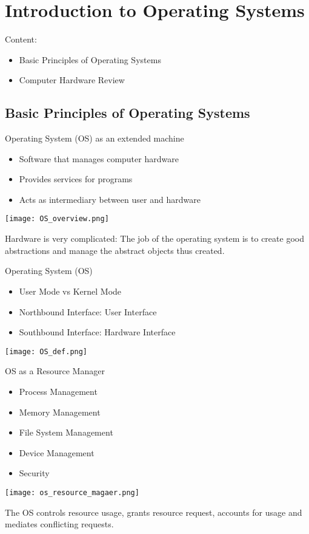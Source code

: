 \section{Introduction to Operating Systems}

\begin{remark}
    Content:
    \begin{itemize}
        \item Basic Principles of Operating Systems
        \item Computer Hardware Review
    \end{itemize}
\end{remark}

\subsection{Basic Principles of Operating Systems}

\begin{concept}{Operating System (OS)} as an extended machine
    \begin{itemize}
        \item Software that manages computer hardware
        \item Provides services for programs
        \item Acts as intermediary between user and hardware
    \end{itemize}
    \texttt{[image: OS\_overview.png]}

    Hardware is very complicated: The job of the operating system is to create good abstractions 
    and manage the abstract objects thus created.
\end{concept}

\begin{definition}{Operating System (OS)}
    \begin{itemize}
        \item User Mode vs Kernel Mode
        \item Northbound Interface: User Interface
        \item Southbound Interface: Hardware Interface
    \end{itemize}
    \texttt{[image: OS\_def.png]}
\end{definition}

\begin{concept}{OS as a Resource Manager}
    \begin{itemize}
        \item Process Management
        \item Memory Management
        \item File System Management
        \item Device Management
        \item Security
    \end{itemize}
    \texttt{[image: os\_resource\_magaer.png]}

    The OS controls resource usage, grants resource request, accounts for usage and mediates conflicting requests.
\end{concept}

